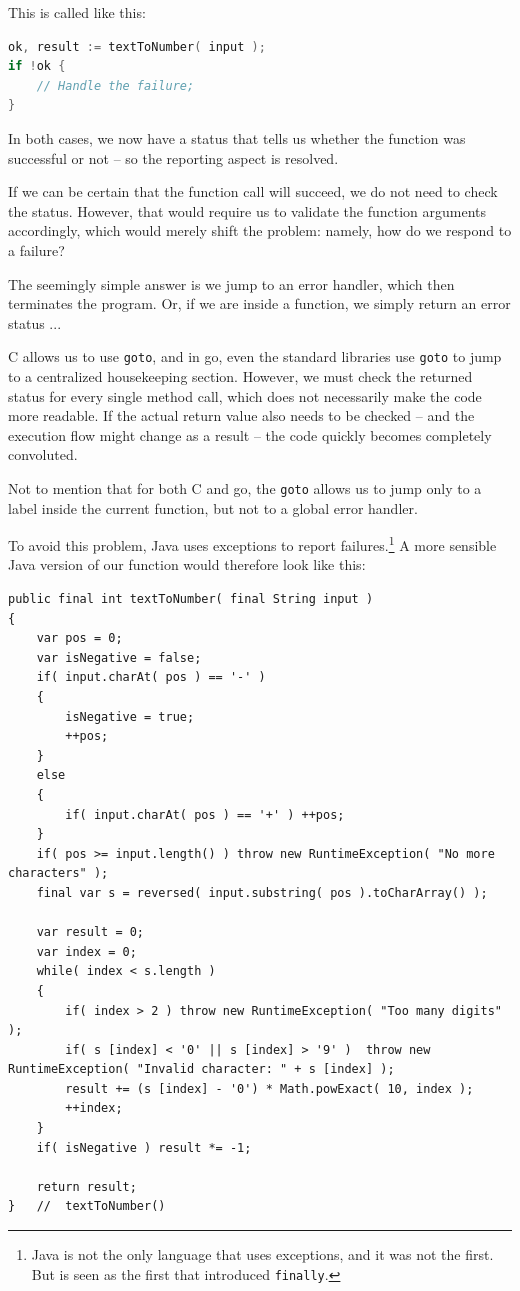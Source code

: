 This is called like this:
\begin{lstlisting}[language=go]
ok, result := textToNumber( input );
if !ok {
    // Handle the failure;
}
\end{lstlisting}

In both cases, we now have a status that tells us whether the function was successful or not – so the reporting aspect is resolved.

If we can be certain that the function call will succeed, we do not need to check the status. However, that would require us to validate the function arguments accordingly, which would merely shift the problem: namely, how do we respond to a failure?

The seemingly simple answer is we jump to an error handler, which then terminates the program. Or, if we are inside a function, we simply return an error status ...

C allows us to use \lstinline|goto|, and in go, even the standard libraries use \lstinline|goto| to jump to a centralized housekeeping section. However, we must check the returned status for every single method call, which does not necessarily make the code more readable. If the actual return value also needs to be checked – and the execution flow might change as a result – the code quickly becomes completely convoluted.

Not to mention that for both C and go, the \lstinline|goto| allows us to jump only to a label inside the current function, but not to a global error handler.

To avoid this problem, Java uses exceptions to report failures.\footnote{Java is not the only language that uses exceptions, and it was not the first. But is seen as the first that introduced \lstinline|finally|.} A more sensible Java version of our function would therefore look like this:
\begin{lstlisting}
public final int textToNumber( final String input )
{
    var pos = 0;
    var isNegative = false;
    if( input.charAt( pos ) == '-' )
    {
        isNegative = true;
        ++pos;
    }
    else
    {
        if( input.charAt( pos ) == '+' ) ++pos;
    }
    if( pos >= input.length() ) throw new RuntimeException( "No more characters" );
    final var s = reversed( input.substring( pos ).toCharArray() );

    var result = 0;
    var index = 0;
    while( index < s.length )
    {
        if( index > 2 ) throw new RuntimeException( "Too many digits" );
        if( s [index] < '0' || s [index] > '9' )  throw new RuntimeException( "Invalid character: " + s [index] );
        result += (s [index] - '0') * Math.powExact( 10, index );
        ++index;
    }
    if( isNegative ) result *= -1;

    return result;
}   //  textToNumber()
\end{lstlisting}

